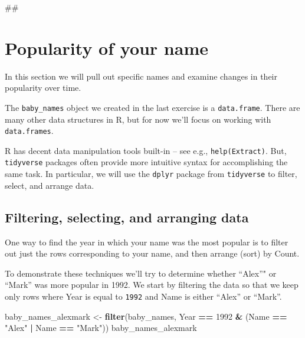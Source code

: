 \documentclass[]{book}
\newenvironment{Shaded}{\begin{snugshade}}{\end{snugshade}}
\newcommand{\KeywordTok}[1]{\textcolor[rgb]{0.13,0.29,0.53}{\textbf{#1}}}
\newcommand{\DecValTok}[1]{\textcolor[rgb]{0.00,0.00,0.81}{#1}}
\newcommand{\StringTok}[1]{\textcolor[rgb]{0.31,0.60,0.02}{#1}}
\newcommand{\OperatorTok}[1]{\textcolor[rgb]{0.81,0.36,0.00}{\textbf{#1}}}
\newcommand{\NormalTok}[1]{#1}
\begin{document}
\begin{Shaded}
\begin{Highlighting}[]
\NormalTok{##}
\end{Highlighting}
\end{Shaded}

\section{Popularity of your name}\label{popularity-of-your-name}

In this section we will pull out specific names and examine changes in
their popularity over time.

The \texttt{baby\_names} object we created in the last exercise is a
\texttt{data.frame}. There are many other data structures in R, but for
now we'll focus on working with \texttt{data.frames}.

R has decent data manipulation tools built-in -- see e.g.,
\texttt{help(Extract)}. But, \texttt{tidyverse} packages often provide
more intuitive syntax for accomplishing the same task. In particular, we
will use the \texttt{dplyr} package from \texttt{tidyverse} to filter,
select, and arrange data.

\subsection{Filtering, selecting, and arranging
data}\label{filtering-selecting-and-arranging-data}

One way to find the year in which your name was the most popular is to
filter out just the rows corresponding to your name, and then arrange
(sort) by Count.

To demonstrate these techniques we'll try to determine whether ``Alex''"
or ``Mark'' was more popular in 1992. We start by filtering the data so
that we keep only rows where Year is equal to \texttt{1992} and Name is
either ``Alex'' or ``Mark''.

\begin{Shaded}
\begin{Highlighting}[]
\NormalTok{baby_names_alexmark <-}\StringTok{ }\KeywordTok{filter}\NormalTok{(baby_names, }
\NormalTok{             Year }\OperatorTok{==}\StringTok{ }\DecValTok{1992} \OperatorTok{&}\StringTok{ }\NormalTok{(Name }\OperatorTok{==}\StringTok{ "Alex"} \OperatorTok{|}\StringTok{ }\NormalTok{Name }\OperatorTok{==}\StringTok{ "Mark"}\NormalTok{))}
\NormalTok{baby_names_alexmark}
\end{Highlighting}
\end{Shaded}
\end{document}
